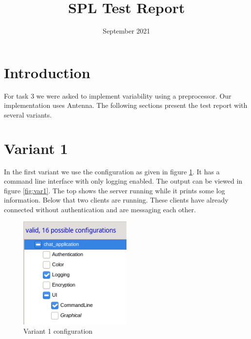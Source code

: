 \documentclass{article}
\title{SPL Test Report}
\date{September 2021}
\begin{document}
\maketitle

\section*{Introduction}

For task 3 we were asked to implement variability using a preprocessor. Our implementation uses Antenna. The following sections present the test report with several variants.

\section*{Variant 1}

In the first variant we use the configuration as given in figure \ref{fig:var1_config}. It has a command line interface with only logging enabled. The output can be viewed in figure \ref{fig:var1}. The top shows the server running while it prints some log information. Below that two clients are running. These clients have already connected without authentication and are messaging each other.

\begin{figure}[!htbp]
    \centering
    \includegraphics[width=0.5\textwidth]{figures/variant1_config.png}
    \caption{Variant 1 configuration}
    \label{fig:var1_config}
\end{figure}
\end{document}
